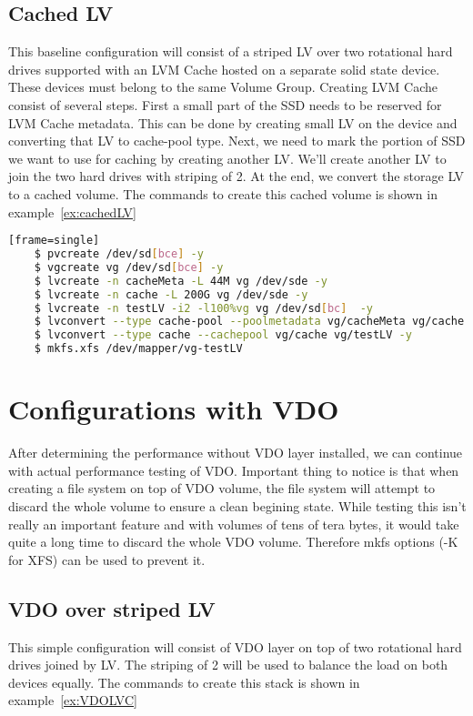\documentclass[
  color, %
  table, %
  lof,   %
  lot,   %
]{fithesis3}
\begin{document}
\subsection{Cached LV}
This baseline configuration will consist of a striped LV over two rotational hard drives supported with an LVM Cache hosted on a separate solid state device. These devices must belong to the same Volume Group. Creating LVM Cache consist of several steps. First a small part of the SSD needs to be reserved for LVM Cache metadata. This can be done by creating small LV on the device and converting that LV to cache-pool type. Next, we need to mark the portion of SSD we want to use for caching by creating another LV. We'll create another LV to join the two hard drives with striping of 2. At the end, we convert the storage LV to a cached volume. The commands to create this cached volume is shown in example~\ref{ex:cachedLV}

\begin{lstlisting}[language=bash, label={ex:cachedLV}, caption={Creating cached logical volume}][frame=single]
    $ pvcreate /dev/sd[bce] -y
    $ vgcreate vg /dev/sd[bce] -y
    $ lvcreate -n cacheMeta -L 44M vg /dev/sde -y
    $ lvcreate -n cache -L 200G vg /dev/sde -y
    $ lvcreate -n testLV -i2 -l100%vg vg /dev/sd[bc]  -y
    $ lvconvert --type cache-pool --poolmetadata vg/cacheMeta vg/cache -y
    $ lvconvert --type cache --cachepool vg/cache vg/testLV -y
    $ mkfs.xfs /dev/mapper/vg-testLV        
\end{lstlisting}


\section{Configurations with VDO}
After determining the performance without VDO layer installed, we can continue with actual performance testing of VDO. Important thing to notice is that when creating a file system on top of VDO volume, the file system will attempt to discard the whole volume to ensure a clean begining state. While testing this isn't really an important feature and with volumes of tens of tera bytes, it would take quite a long time to discard the whole VDO volume. Therefore mkfs options (-K for XFS) can be used to prevent it.

\subsection{VDO over striped LV}
This simple configuration will consist of VDO layer on top of two rotational hard drives joined by LV. The striping of 2 will be used to balance the load on both devices equally. The commands to create this stack is shown in example~\ref{ex:VDOLVC}
\end{document}
